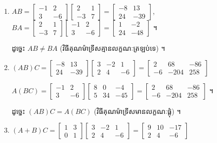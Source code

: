 \begin{enumerate}[a]
  \item $AB = \begin{bmatrix} -1 & 2\\ 3 & -6 \end{bmatrix}\begin{bmatrix} 2 & 1\\ -3 & 7 \end{bmatrix} = \begin{bmatrix} -8 & 13\\ 24 & -39 \end{bmatrix}$, \ $BA = \begin{bmatrix} 2 & 1\\ -3 & 7 \end{bmatrix}\begin{bmatrix} -1 & 2\\ 3 & -6 \end{bmatrix} = \begin{bmatrix} 1 & -2\\ 24 & -48 \end{bmatrix}$ ។

  ដូច្នេះ $AB \ne BA$ (វិធីគុណម៉ាទ្រីសគ្មានលក្ខណៈត្រឡប់ទេ) ។
  \item $(AB)C = \begin{bmatrix} -8 & 13\\ 24 & -39 \end{bmatrix}\begin{bmatrix} 3 & -2 & 1\\ 2 & 4 & -6 \end{bmatrix} = \begin{bmatrix} 2 & 68 & -86\\ -6 & -204 & 258 \end{bmatrix}$

  $A(BC) = \begin{bmatrix} -1 & 2\\ 3 & -6 \end{bmatrix}\begin{bmatrix} 8 & 0 & -4\\ 5 & 34 & -45 \end{bmatrix} = \begin{bmatrix} 2 & 68 & -86\\ -6 & -204 & 258 \end{bmatrix}$ ។

  ដូច្នេះ $(AB)C = A(BC)$ (វិធីគុណម៉ាទ្រីសមានលក្ខណៈផ្តុំ) ។
  \item $(A + B)C = \begin{bmatrix} 1 & 3\\ 0 & 1 \end{bmatrix}\begin{bmatrix} 3 & -2 & 1\\ 2 & 4 & -6 \end{bmatrix} = \begin{bmatrix} 9 & 10 & -17\\ 2 & 4 & -6 \end{bmatrix}$


\end{enumerate}

